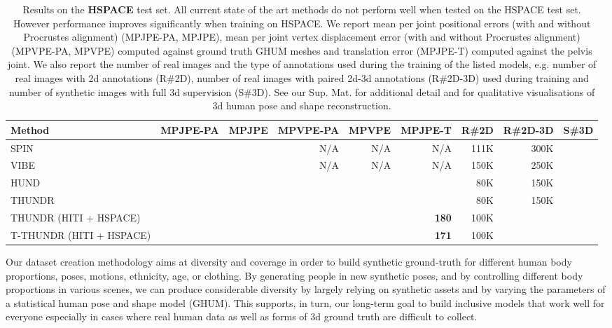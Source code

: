 \documentclass[10pt,twocolumn,letterpaper]{article}
\begin{document}
\begin{table*}[htbp]
    \small
    \centering
    \begin{tabular}[t]{|l||r|r|r|r|r|r|r|r|}
    \hline
    \textbf{Method}  & {MPJPE-PA} & {MPJPE} & {MPVPE-PA} & {MPVPE} & {MPJPE-T} & R\#{2D} & R\#{2D-3D} & S\#{3D} \\
    \hline
    SPIN \cite{kolotouros2019learning} &  &  & N/A & N/A & N/A & 111K & 300K & \\
    \hline
    VIBE \cite{kocabas2019vibe} &  &  & N/A & N/A & N/A & 150K & 250K  &  \\
    \hline
    HUND \cite{zanfir2020neural} &  &  &  &  &  & 80K & 150K &  \\    
    \hline
    THUNDR \cite{Zanfir_2021_ICCV} &  &  &  &  &  & 80K & 150K &  \\
    \hline
    \hline
    THUNDR (HITI + HSPACE) &  &  &  &  & \textbf{180} & 100K &  &  \\
    \hline
    T-THUNDR (HITI + HSPACE) &  &  &  &  & \textbf{171} & 100K &  &  \\
    \hline
    \end{tabular}

    \caption{\small Results on the \textbf{HSPACE} test set. All current state of the art methods do not perform well when tested on the HSPACE test set. However performance improves significantly when training on HSPACE. We report mean per joint positional errors (with and without Procrustes alignment) (MPJPE-PA, MPJPE), mean per joint vertex displacement error (with and without Procrustes alignment) (MPVPE-PA, MPVPE) computed against ground truth GHUM meshes and translation error (MPJPE-T) computed against the pelvis joint. We also report the number of real images and the type of annotations used during the training of the listed models, e.g. number of real images with 2d annotations (R\#2D), number of real  images with paired 2d-3d annotations (R\#2D-3D) used during training and number of synthetic images with full 3d supervision (S\#3D). See our Sup. Mat. for additional detail and for qualitative visualisations of 3d human pose and shape reconstruction.}
\label{tbl:ablation_space}
\end{table*}

 Our dataset creation methodology aims at diversity and coverage in order to build synthetic ground-truth for different human body proportions, poses, motions, ethnicity, age, or clothing.  By generating people in new synthetic poses, and by controlling different body proportions in various scenes, we can produce considerable diversity by largely relying on synthetic assets and by varying the parameters of a statistical human pose and shape model (GHUM). This supports, in turn, our long-term goal to build inclusive models that work well for everyone especially in cases where real human data as well as forms of 3d ground truth are difficult to collect.
\end{document}
